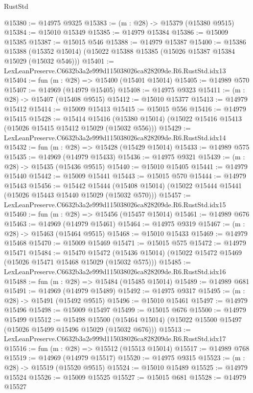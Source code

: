 \begin{lexlean}{RustStd}
\begin{coremodule}
@15380 := @14975 @9325
@15383 := (m : @28) -> @15379 (@15380 @9515)
@15384 := @15010 @15349
@15385 := @14979 @15384
@15386 := @15009 @15385
@15387 := @15015 @546
@15388 := @14979 @15387
@15400 := @15386
    @15388
    (@15352 @15014)
    (@15022 @15388 @15385 (@15026 @15387 @15384 @15029 (@15032 @546)))
@15401 := LexLeanPreserve.C6632b3a2e999d115038026ca828209de.R6.RustStd.idx13
@15404 := fun (m : @28) => @15400 (@15401 @15014)
@15405 := @14989 @570
@15407 := @14969 (@14979 @15405)
@15408 := @14975 @9323
@15411 := (m : @28) -> @15407 (@15408 @9515)
@15412 := @15010 @15377
@15413 := @14979 @15412
@15414 := @15009 @15413
@15415 := @15015 @556
@15416 := @14979 @15415
@15428 := @15414
    @15416
    (@15380 @15014)
    (@15022 @15416 @15413 (@15026 @15415 @15412 @15029 (@15032 @556)))
@15429 := LexLeanPreserve.C6632b3a2e999d115038026ca828209de.R6.RustStd.idx14
@15432 := fun (m : @28) => @15428 (@15429 @15014)
@15433 := @14989 @575
@15435 := @14969 (@14979 @15433)
@15436 := @14975 @9321
@15439 := (m : @28) -> @15435 (@15436 @9515)
@15440 := @15010 @15405
@15441 := @14979 @15440
@15442 := @15009 @15441
@15443 := @15015 @570
@15444 := @14979 @15443
@15456 := @15442
    @15444
    (@15408 @15014)
    (@15022 @15444 @15441 (@15026 @15443 @15440 @15029 (@15032 @570)))
@15457 := LexLeanPreserve.C6632b3a2e999d115038026ca828209de.R6.RustStd.idx15
@15460 := fun (m : @28) => @15456 (@15457 @15014)
@15461 := @14989 @676
@15463 := @14969 (@14979 @15461)
@15464 := @14975 @9319
@15467 := (m : @28) -> @15463 (@15464 @9515)
@15468 := @15010 @15433
@15469 := @14979 @15468
@15470 := @15009 @15469
@15471 := @15015 @575
@15472 := @14979 @15471
@15484 := @15470
    @15472
    (@15436 @15014)
    (@15022 @15472 @15469 (@15026 @15471 @15468 @15029 (@15032 @575)))
@15485 := LexLeanPreserve.C6632b3a2e999d115038026ca828209de.R6.RustStd.idx16
@15488 := fun (m : @28) => @15484 (@15485 @15014)
@15489 := @14989 @681
@15491 := @14969 (@14979 @15489)
@15492 := @14975 @9317
@15495 := (m : @28) -> @15491 (@15492 @9515)
@15496 := @15010 @15461
@15497 := @14979 @15496
@15498 := @15009 @15497
@15499 := @15015 @676
@15500 := @14979 @15499
@15512 := @15498
    @15500
    (@15464 @15014)
    (@15022 @15500 @15497 (@15026 @15499 @15496 @15029 (@15032 @676)))
@15513 := LexLeanPreserve.C6632b3a2e999d115038026ca828209de.R6.RustStd.idx17
@15516 := fun (m : @28) => @15512 (@15513 @15014)
@15517 := @14989 @768
@15519 := @14969 (@14979 @15517)
@15520 := @14975 @9315
@15523 := (m : @28) -> @15519 (@15520 @9515)
@15524 := @15010 @15489
@15525 := @14979 @15524
@15526 := @15009 @15525
@15527 := @15015 @681
@15528 := @14979 @15527

\end{coremodule}
\end{lexlean}
